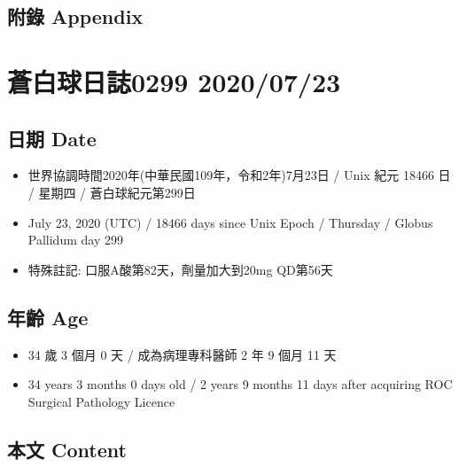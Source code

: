 \documentclass[a5paper, 11pt
]{book}
\providecommand{\tightlist}{%
  \setlength{\itemsep}{0pt}\setlength{\parskip}{0pt}}
\begin{document}
\hypertarget{ux9644ux9304-appendix-45}{%
\subsection{附錄 Appendix}\label{ux9644ux9304-appendix-45}}

\hypertarget{ux84bcux767dux7403ux65e5ux8a8c0299-20200723}{%
\section{蒼白球日誌0299
2020/07/23}\label{ux84bcux767dux7403ux65e5ux8a8c0299-20200723}}

\hypertarget{ux65e5ux671f-date-46}{%
\subsection{日期 Date}\label{ux65e5ux671f-date-46}}

\begin{itemize}
\tightlist
\item
  世界協調時間2020年(中華民國109年，令和2年)7月23日 / Unix 紀元 18466 日
  / 星期四 / 蒼白球紀元第299日
\item
  July 23, 2020 (UTC) / 18466 days since Unix Epoch / Thursday / Globus
  Pallidum day 299
\item
  特殊註記: 口服A酸第82天，劑量加大到20mg QD第56天
\end{itemize}

\hypertarget{ux5e74ux9f61-age-46}{%
\subsection{年齡 Age}\label{ux5e74ux9f61-age-46}}

\begin{itemize}
\tightlist
\item
  34 歲 3 個月 0 天 / 成為病理專科醫師 2 年 9 個月 11 天
\item
  34 years 3 months 0 days old / 2 years 9 months 11 days after
  acquiring ROC Surgical Pathology Licence
\end{itemize}

\hypertarget{ux672cux6587-content-46}{%
\subsection{本文 Content}\label{ux672cux6587-content-46}}
\end{document}
